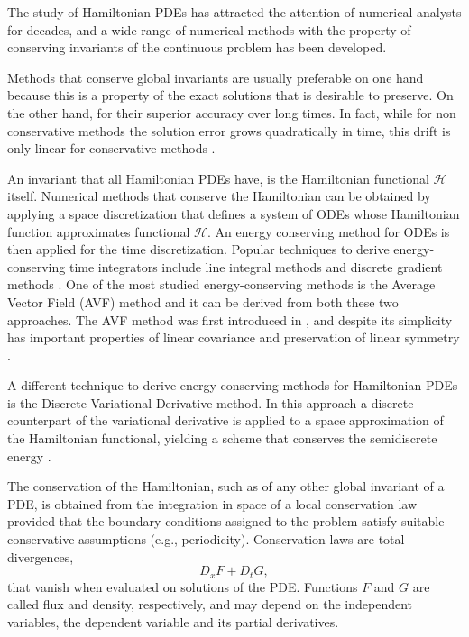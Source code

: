 \documentclass[twoside]{article}
\numberwithin{equation}{section}
\begin{document}
The study of Hamiltonian PDEs has attracted the attention of numerical analysts for decades, and a wide range of numerical methods with the property of conserving invariants of the continuous problem has been developed.

Methods that conserve global invariants are usually preferable on one hand because this is a property of the exact solutions that is desirable to preserve. On the other hand, for their superior accuracy over long times. In fact, while for non conservative methods the solution error grows quadratically in time, this drift is only linear for conservative methods \cite{Frut,Duran1,Duran2}.

An invariant that all Hamiltonian PDEs have, is the Hamiltonian functional $\mathcal{H}$ itself.
Numerical methods that conserve the Hamiltonian can be obtained by applying a space discretization that defines a system of ODEs whose Hamiltonian function approximates functional $\mathcal{H}$. An energy conserving method for ODEs is then applied for the time discretization. Popular techniques to derive energy-conserving time integrators include line integral methods \cite{Limbook,Brugnano2019,BruMon} and discrete gradient methods \cite{Celle,Dahlby,McLachlan,Rob,Gonz}.  One of the most studied energy-conserving methods is the Average Vector Field (AVF) method and it can be derived from both these two approaches. The AVF method was first introduced in \cite{Quisp}, and despite its simplicity has important properties of linear covariance and preservation of linear symmetry \cite{Celle}. 

A different technique to derive energy conserving methods for Hamiltonian PDEs is the Discrete Variational Derivative method. In this approach a discrete counterpart of the variational derivative is applied to a space approximation of the Hamiltonian functional, yielding a scheme that conserves the semidiscrete energy \cite{Furi,furibook,Matsuo,Mats}. 

The conservation of the Hamiltonian, such as of any other global invariant of a PDE, is obtained from the integration in space of a local conservation law provided that the boundary conditions assigned to the problem satisfy suitable conservative assumptions (e.g., periodicity). Conservation laws are total divergences,
\begin{equation}\label{CLAw}
D_x F+D_t G,
\end{equation}
that vanish when evaluated on solutions of the PDE. Functions $F$ and $G$ are called flux and density, respectively, and may depend on the independent variables, the dependent variable and its partial derivatives.
\end{document}
